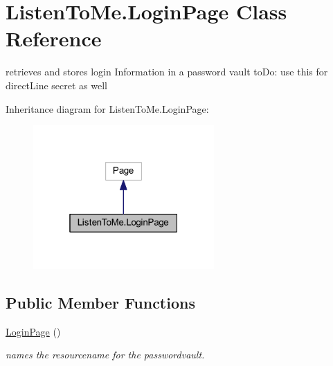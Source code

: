 \hypertarget{class_listen_to_me_1_1_login_page}{}\section{Listen\+To\+Me.\+Login\+Page Class Reference}
\label{class_listen_to_me_1_1_login_page}


retrieves and stores login Information in a password vault to\+Do\+: use this for direct\+Line secret as well  




Inheritance diagram for Listen\+To\+Me.\+Login\+Page\+:\nopagebreak
\begin{figure}[H]
\begin{center}
\leavevmode
\includegraphics[width=196pt]{class_listen_to_me_1_1_login_page__inherit__graph}
\end{center}
\end{figure}
\subsection*{Public Member Functions}
\begin{DoxyCompactItemize}
\item 
\mbox{\hyperlink{class_listen_to_me_1_1_login_page_afcefc5f9f4f5cee5d9f5e15493e4058b}{Login\+Page}} ()
\begin{DoxyCompactList}\small\item\em names the resourcename for the passwordvault. \end{DoxyCompactList}\end{DoxyCompactItemize}
